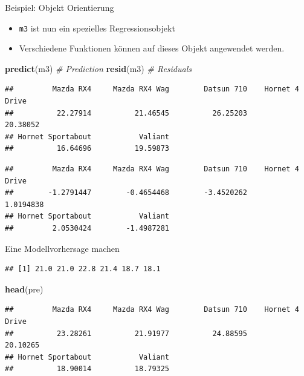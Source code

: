 \documentclass[ignorenonframetext,]{beamer}
\newenvironment{Shaded}{\begin{snugshade}}{\end{snugshade}}
\newcommand{\CommentTok}[1]{\textcolor[rgb]{0.56,0.35,0.01}{\textit{#1}}}
\newcommand{\KeywordTok}[1]{\textcolor[rgb]{0.13,0.29,0.53}{\textbf{#1}}}
\newcommand{\NormalTok}[1]{#1}
\newcommand{\OperatorTok}[1]{\textcolor[rgb]{0.81,0.36,0.00}{\textbf{#1}}}
\newcommand{\StringTok}[1]{\textcolor[rgb]{0.31,0.60,0.02}{#1}}
\providecommand{\tightlist}{%
  \setlength{\itemsep}{0pt}\setlength{\parskip}{0pt}}
\begin{document}
\begin{frame}[fragile]{Beispiel: Objekt Orientierung}
\protect\hypertarget{beispiel-objekt-orientierung}{}

\begin{itemize}
\tightlist
\item
  \texttt{m3} ist nun ein spezielles Regressionsobjekt
\item
  Verschiedene Funktionen können auf dieses Objekt angewendet werden.
\end{itemize}

\begin{Shaded}
\begin{Highlighting}[]
\KeywordTok{predict}\NormalTok{(m3) }\CommentTok{# Prediction}
\KeywordTok{resid}\NormalTok{(m3) }\CommentTok{# Residuals}
\end{Highlighting}
\end{Shaded}

\begin{verbatim}
##         Mazda RX4     Mazda RX4 Wag        Datsun 710    Hornet 4 Drive 
##          22.27914          21.46545          26.25203          20.38052 
## Hornet Sportabout           Valiant 
##          16.64696          19.59873
\end{verbatim}

\begin{verbatim}
##         Mazda RX4     Mazda RX4 Wag        Datsun 710    Hornet 4 Drive 
##        -1.2791447        -0.4654468        -3.4520262         1.0194838 
## Hornet Sportabout           Valiant 
##         2.0530424        -1.4987281
\end{verbatim}

\end{frame}

\begin{frame}[fragile]{Eine Modellvorhersage machen}
\protect\hypertarget{eine-modellvorhersage-machen}{}

\begin{Shaded}
\end{Shaded}

\begin{verbatim}
## [1] 21.0 21.0 22.8 21.4 18.7 18.1
\end{verbatim}

\begin{Shaded}
\begin{Highlighting}[]
\KeywordTok{head}\NormalTok{(pre)}
\end{Highlighting}
\end{Shaded}

\begin{verbatim}
##         Mazda RX4     Mazda RX4 Wag        Datsun 710    Hornet 4 Drive 
##          23.28261          21.91977          24.88595          20.10265 
## Hornet Sportabout           Valiant 
##          18.90014          18.79325
\end{verbatim}

\end{frame}
\end{document}
